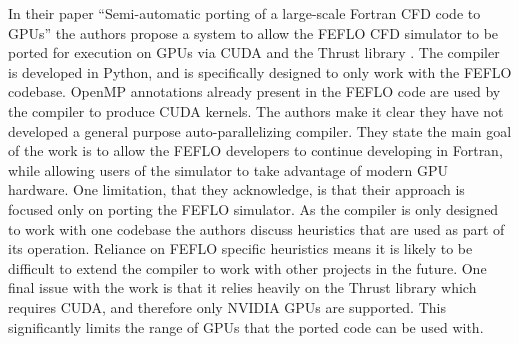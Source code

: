 \documentclass{mpaper}
\begin{document}
In their paper ``Semi-automatic porting of a large-scale Fortran CFD code to GPUs'' \cite{Corrigan2012} the authors propose a system to allow the FEFLO CFD simulator \cite{Lbhner2001} to be ported for execution on GPUs via CUDA and the Thrust library \cite{Library}. The compiler is developed in Python, and is specifically designed to only work with the FEFLO codebase. OpenMP \cite{OpenMP} annotations already present in the FEFLO code are used by the compiler to produce CUDA kernels. The authors make it clear they have not developed a general purpose auto-parallelizing compiler. They state the main goal of the work is to allow the FEFLO developers to continue developing in Fortran, while allowing users of the simulator to take advantage of modern GPU hardware. One limitation, that they acknowledge, is that their approach is focused only on porting the FEFLO simulator. As the compiler is only designed to work with one codebase the authors discuss heuristics that are used as part of its operation. Reliance on FEFLO specific heuristics means it is likely to be difficult to extend the compiler to work with other projects in the future. One final issue with the work is that it relies heavily on the Thrust library which requires CUDA, and therefore only NVIDIA GPUs are supported. This significantly limits the range of GPUs that the ported code can be used with.
\end{document}
